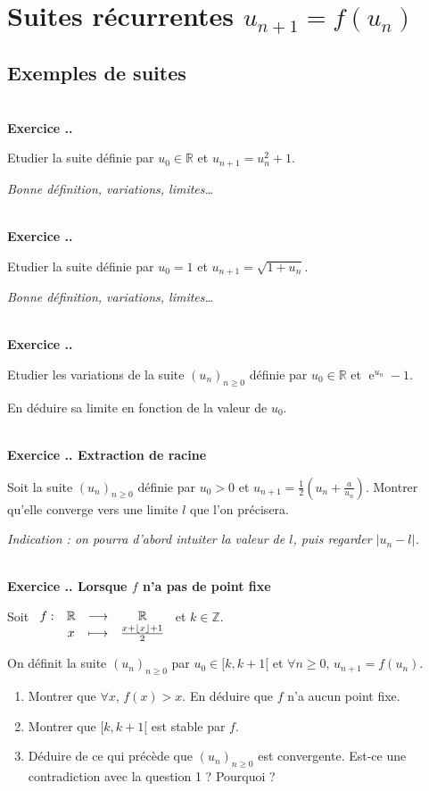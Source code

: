 \documentclass{article}
\newcommand{\fonction}[5]{\raisebox{-0.5\baselineskip}{$\begin{array}{lccc}
    #1: & #2 & \longrightarrow & #3 \\
        & #4 & \longmapsto & #5 \end{array}$}}
\newcommand{\ex}{{\operatorname{e}}}
\newcommand{\mb}[1]{\mathbb{#1}}
\newcounter{exo}
\newcommand{\exercice}[1][\null]{\textbf{\\ Exercice \thesection.\theexo. #1} \addtocounter{exo}{1}}
\begin{document}
\section{Suites récurrentes $u_{n+1} = f(u_n)$}


\subsection{Exemples de suites}


\exercice

Etudier la suite définie par $u_0 \in \mb{R}$ et $u_{n+1}=u_n^2 +1$.

\emph{Bonne définition, variations, limites\dots}



\exercice

Etudier la suite définie par $u_0 = 1$ et $u_{n+1}=\sqrt{1+u_n}$.

\emph{Bonne définition, variations, limites\dots}




\exercice

Etudier les variations de la suite $(u_n)_{n \ge 0}$ définie par $u_0 \in \mb{R}$ et $\ex^{u_{n}} -1$.

En déduire sa limite en fonction de la valeur de $u_0$.


\exercice[Extraction de racine]

Soit la suite $(u_n)_{n \ge 0}$ définie par $u_0 > 0$ et $u_{n+1} = \frac{1}{2}\left(u_n + \frac{a}{u_n}\right)$. Montrer qu'elle converge vers une limite $l$ que l'on précisera.


\emph{Indication : on pourra d'abord intuiter la valeur de $l$, puis regarder $|u_n - l|$.}


\exercice[Lorsque $f$ n'a pas de point fixe]

Soit $\fonction{f}{\mb{R}}{\mb{R}}{x}{\frac{x + \lfloor x \rfloor +1}{2}}$ et $k \in \mb{Z}$.

On définit la suite $(u_n)_{n \ge 0}$ par $u_0 \in [k, k+1[$ et $\forall n \ge 0$, $u_{n+1}=f(u_n)$.

\begin{enumerate}

\item Montrer que $\forall x$, $f(x) > x$. En déduire que $f$ n'a aucun point fixe.

\item Montrer que $[k,k+1[$ est stable par $f$.

\item Déduire de ce qui précède que $(u_n)_{n \ge 0}$ est convergente. Est-ce une contradiction avec la question 1 ? Pourquoi ?

\end{enumerate}
\end{document}
